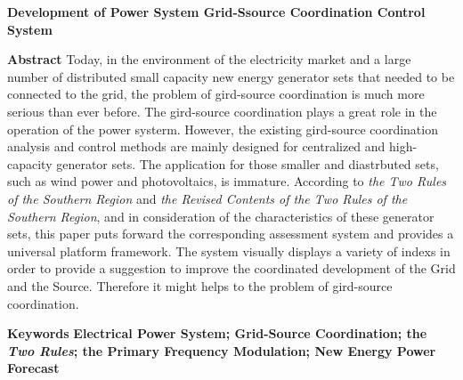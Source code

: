 \begin{center}
  \textbf{Development of Power System Grid-Ssource Coordination Control System}
\end{center}
\vspace{0.5cm}\noindent\textbf{\bf{Abstract}\quad}
Today, in the environment of the electricity market and a large number of distributed small capacity new energy generator sets that needed to be connected to the grid, the problem of gird-source coordination is much more serious than ever before. The gird-source coordination plays a great role in the operation of the power systerm. However, the existing gird-source coordination analysis and control methods are mainly designed for centralized and high-capacity generator sets. The application for those smaller and diastrbuted sets, such as wind power and photovoltaics, is immature. According to \textit{the Two Rules of the Southern Region} and \textit{the Revised Contents of the Two Rules of the Southern Region}, and in consideration of the characteristics of these generator sets, this paper puts forward the corresponding assessment system and provides a universal platform framework. The system visually displays a variety of indexs in order to provide a suggestion to improve the coordinated development of the Grid and the Source. Therefore it might helps to the problem of gird-source coordination.
\par\vspace{1cm}\noindent\textbf{Keywords\quad}
\textbf{Electrical Power System; Grid-Source Coordination; the \textit{Two Rules}; the Primary Frequency Modulation; New Energy Power Forecast}

